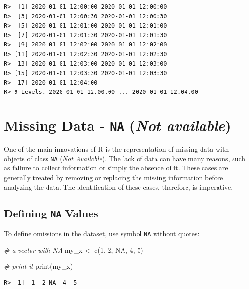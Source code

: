 \documentclass[
  12pt,
]{book}
\newenvironment{Shaded}{\begin{snugshade}}{\end{snugshade}}
\newcommand{\CommentTok}[1]{\textcolor[rgb]{0.37,0.37,0.37}{\textit{#1}}}
\newcommand{\ConstantTok}[1]{\textcolor[rgb]{0,0,0}{#1}}
\newcommand{\DecValTok}[1]{\textcolor[rgb]{0.06,0.06,0.06}{#1}}
\newcommand{\FunctionTok}[1]{\textcolor[rgb]{0,0,0}{#1}}
\newcommand{\NormalTok}[1]{#1}
\newcommand{\OtherTok}[1]{\textcolor[rgb]{0.37,0.37,0.37}{#1}}
\begin{document}
\begin{verbatim}
R>  [1] 2020-01-01 12:00:00 2020-01-01 12:00:00
R>  [3] 2020-01-01 12:00:30 2020-01-01 12:00:30
R>  [5] 2020-01-01 12:01:00 2020-01-01 12:01:00
R>  [7] 2020-01-01 12:01:30 2020-01-01 12:01:30
R>  [9] 2020-01-01 12:02:00 2020-01-01 12:02:00
R> [11] 2020-01-01 12:02:30 2020-01-01 12:02:30
R> [13] 2020-01-01 12:03:00 2020-01-01 12:03:00
R> [15] 2020-01-01 12:03:30 2020-01-01 12:03:30
R> [17] 2020-01-01 12:04:00
R> 9 Levels: 2020-01-01 12:00:00 ... 2020-01-01 12:04:00
\end{verbatim}

\hypertarget{missing-data---na-not-available}{%
\section{\texorpdfstring{Missing Data - \texttt{NA} (\emph{Not available})}{Missing Data - NA (Not available)}}\label{missing-data---na-not-available}}

One of the main innovations of R is the representation of missing data with objects of class \texttt{NA} (\emph{Not Available}). The lack of data can have many reasons, such as failure to collect information or simply the absence of it. These cases are generally treated by removing or replacing the missing information before analyzing the data. The identification of these cases, therefore, is imperative. 

\hypertarget{defining-na-values}{%
\subsection{\texorpdfstring{Defining \texttt{NA} Values}{Defining NA Values}}\label{defining-na-values}}

To define omissions in the dataset, use symbol \texttt{NA} without quotes:

\begin{Shaded}
\begin{Highlighting}[]
\CommentTok{\# a vector with NA}
\NormalTok{my\_x }\OtherTok{\textless{}{-}} \FunctionTok{c}\NormalTok{(}\DecValTok{1}\NormalTok{, }\DecValTok{2}\NormalTok{, }\ConstantTok{NA}\NormalTok{, }\DecValTok{4}\NormalTok{, }\DecValTok{5}\NormalTok{)}

\CommentTok{\# print it}
\FunctionTok{print}\NormalTok{(my\_x)}
\end{Highlighting}
\end{Shaded}

\begin{verbatim}
R> [1]  1  2 NA  4  5
\end{verbatim}
\end{document}
